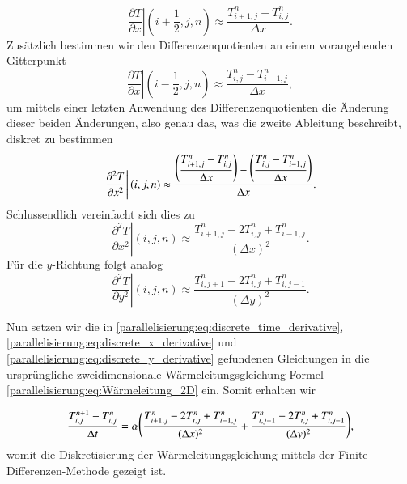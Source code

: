 \begin{equation}
	\left. \frac{\partial T}{\partial x} \right|{(i+{\textstyle\frac{1}{2}},j,n)}
	\approx \frac{T_{i+1,j}^n - T_{i,j}^n}{\Delta x}.
\end{equation}
Zusätzlich bestimmen wir den Differenzenquotienten an einem vorangehenden Gitterpunkt
\begin{equation}
	\left. \frac{\partial T}{\partial x} \right|{(i-{\textstyle\frac{1}{2}},j,n)}
	\approx \frac{T_{i,j}^n - T_{i-1,j}^n}{\Delta x},
\end{equation}
um mittels einer letzten Anwendung des Differenzenquotienten die Änderung dieser beiden Änderungen, also genau das, was die zweite Ableitung beschreibt, diskret zu bestimmen
\begin{equation}
	\displaystyle
	\left. \frac{\partial^2 T}{\partial x^2} \right|{(i,j,n)}
	\approx
	\frac{\displaystyle
		\raisebox{2pt}{$\displaystyle
		\Biggl(\raisebox{-2pt}{$\displaystyle \frac{T_{i+1,j}^n - T_{i,j}^n}{\Delta x}$} \Biggr)
		$}
		-
		\raisebox{2pt}{$\displaystyle
		\Biggl(\raisebox{-2pt}{$\displaystyle \frac{T_{i,j}^n - T_{i-1,j}^n}{\Delta x}$} \Biggr)
		$}
	}{\Delta x}.
\end{equation}
Schlussendlich vereinfacht sich dies zu 
\begin{equation}
	\label{parallelisierung:eq:discrete_x_derivative}
	\left. \frac{\partial^2 T}{\partial x^2} \right|{(i,j,n)} \approx \frac{T_{i+1,j}^n - 2T_{i,j}^n + T_{i-1,j}^n}{(\Delta x)^2}.
\end{equation}
Für die $y$-Richtung folgt analog
\begin{equation}
	\label{parallelisierung:eq:discrete_y_derivative}
	\left. \frac{\partial^2 T}{\partial y^2} \right|{(i,j,n)} \approx \frac{T_{i,j+1}^n - 2T_{i,j}^n + T_{i,j-1}^n}{(\Delta y)^2}.
\end{equation}

Nun setzen wir die in \eqref{parallelisierung:eq:discrete_time_derivative},  \eqref{parallelisierung:eq:discrete_x_derivative} und \eqref{parallelisierung:eq:discrete_y_derivative} gefundenen Gleichungen in die ursprüngliche zweidimensionale Wärmeleitungsgleichung Formel \eqref{parallelisierung:eq:Wärmeleitung_2D} ein.
Somit erhalten wir 

\begin{equation}
	\label{parallelisierung:eq:update_formula_unsorted}
	\frac{T_{i,j}^{n+1} - T_{i,j}^n}{\Delta t}
	=
	\alpha
	\raisebox{1.5pt}{$\displaystyle
	\Biggl(
	\raisebox{-1.5pt}{$\displaystyle
	\frac{T_{i+1,j}^n - 2 T_{i,j}^n + T_{i-1,j}^n}{(\Delta x)^2}
	+
	\frac{T_{i,j+1}^n - 2 T_{i,j}^n + T_{i,j-1}^n}{(\Delta y)^2}
	$}
	\Biggr)
	$}
	,
\end{equation}
womit die Diskretisierung der Wärmeleitungsgleichung mittels der Finite-Differenzen-Methode gezeigt ist.

